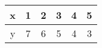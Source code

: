\resizebox{\columnwidth}{!} {
	\begin{tabular}{|c|c|c|c|c|c|}
		\hline
		x &1 &2&3 & 4& 5 \\
		\hline
		y &7 & 6 & 5 &4 & 3\\
		\hline
	\end{tabular}
}
